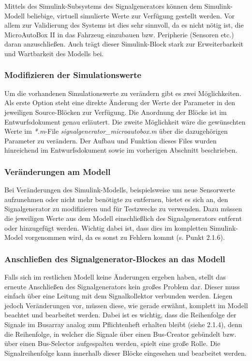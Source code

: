 \documentclass[fontsize = 12pt, paper = a4]{scrreprt}
\begin{document}
Mittels des Simulink-Subsystems des Signalgenerators können dem Simulink-Modell beliebige, virtuell simulierte Werte zur Verfügung gestellt werden. Vor allem zur Validierung des Systems ist dies sehr sinnvoll, da es nicht nötig ist, die MicroAutoBox II in das Fahrzeug einzubauen bzw. Peripherie (Sensoren etc.) daran anzuschließen. Auch trägt dieser Simulink-Block stark zur Erweiterbarkeit und Wartbarkeit des Modells bei.  

\subsubsection{Modifizieren der Simulationswerte}

Um die vorhandenen Simulationswerte zu verändern gibt es zwei Möglichkeiten. 
Als erste Option steht eine direkte Änderung der Werte  der Parameter in den jeweiligen Source-Blöcken zur Verfügung. 
Die Anordnung der Blöcke ist im Entwurfsdokument genau erläutert. 
Die zweite Möglichkeit wäre die gewünschten Werte im \textit{*.m}-File \textit{signalgenerator\_microautobox.m} über die dazugehörigen Parameter zu verändern. 
Der Aufbau und Funktion dieses Files wurden hinreichend im Entwurfsdokument sowie im vorherigen Abschnitt beschrieben.


\subsubsection{Veränderungen am Modell} 

Bei Veränderungen des Simulink-Modells, beispielsweise um neue Sensorwerte aufzunehmen oder nicht mehr benötigte zu entfernen, bietet es sich an, den Signalgenerator zu modifizieren und für Testzwecke zu verwenden. Dazu müssen die jeweiligen Werte aus dem Modell einschließlich des Signalgenerators entfernt oder hinzugefügt werden. Wichtig dabei ist, dass dies im kompletten Simulink-Model vorgenommen wird, da es sonst zu Fehlern kommt (s. Punkt 2.1.6). 


\subsubsection{Anschließen des Signalgenerator-Blockes an das Modell}

Falls sich im restlichen Modell keine Änderungen ergeben haben, stellt das erneute Anschließen des Signalgenerators kein großes Problem dar. 
Dieser muss einfach über eine Leitung mit dem Signalkollektor verbunden werden.  
Liegen jedoch Veränderungen vor, müssen diese, wie gerade erwähnt, komplett im Modell beachtet und bearbeitet werden. 
Dabei ist es wichtig, dass die Reihenfolge der Signale im Busarray analog zum Pflichtenheft erhalten bleibt (siehe 2.1.4), denn die Reihenfolge, in welcher die Signale über einen Bus-Creator gebündelt bzw. über einen Bus-Selector aufgespalten werden, spielt eine große Rolle. 
Die Signalreihenfolge kann innerhalb dieser Blöcke eingesehen und bearbeitet werden. 
\end{document}
